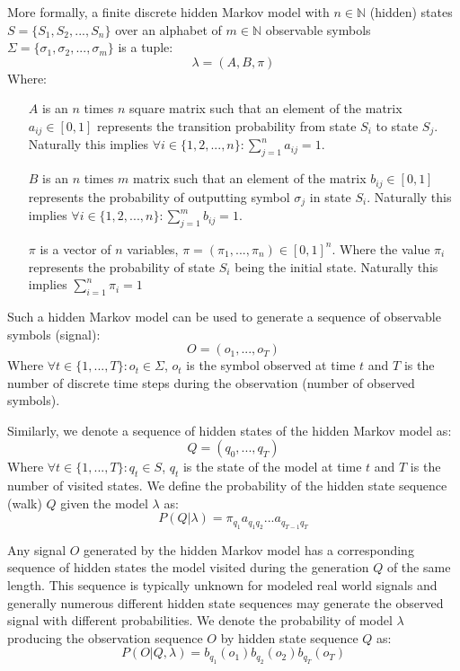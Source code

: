 More formally, a finite discrete hidden Markov model with $n \in \mathbb{N}$ (hidden) states $S = \{S_1, S_2, ..., S_n\}$ over an alphabet of $m \in \mathbb{N}$ observable symbols $\Sigma=\{\sigma_1, \sigma_2, ..., \sigma_m\}$ is a tuple: $$\lambda = (A, B, \pi)$$
Where:
\begin{itemize}
	\item[$A$] is an $n$ times $n$ square matrix such that an element of the matrix ${a_{ij} \in [0, 1]}$ represents the transition probability from state $S_i$ to state $S_j$. Naturally this implies ${\forall i \in \{1, 2, ..., n\}: \sum_{j=1}^n{a_{ij}} = 1}$.
	\item[$B$] is an $n$ times $m$ matrix such that an element of the matrix ${b_{ij} \in [0, 1]}$ represents the probability of outputting symbol $\sigma_j$ in state $S_i$. Naturally this implies ${\forall i \in \{1, 2, ..., n\}: \sum_{j=1}^m{b_{ij}} = 1}$.
	\item[$\pi$] is a vector of $n$ variables, ${\pi=(\pi_1, ..., \pi_n) \in [0, 1]^n}$. Where the value $\pi_i$ represents the probability of state $S_i$ being the initial state. Naturally this implies ${\sum_{i=1}^n{\pi_i} = 1}$
\end{itemize}

Such a hidden Markov model can be used to generate a sequence of observable symbols (signal): $$O = (o_1, ..., o_T)$$
Where ${\forall t \in \{1, ..., T\}: o_t \in \Sigma}$, $o_t$ is the symbol observed at time $t$ and $T$ is the number of discrete time steps during the observation (number of observed symbols).

Similarly, we denote a sequence of hidden states of the hidden Markov model as: $$Q = (q_0, ..., q_T)$$
Where ${\forall t \in \{1, ..., T\}: q_t \in S}$, $q_t$ is the state of the model at time $t$ and $T$ is the number of visited states.
We define the probability of the hidden state sequence (walk) $Q$ given the model $\lambda$ as:
$$P(Q|\lambda) = \pi_{q_1}a_{q_1q_2}...a_{q_{T-1}q_T}$$

Any signal $O$ generated by the hidden Markov model has a corresponding sequence of hidden states the model visited during the generation $Q$ of the same length. This sequence is typically unknown for modeled real world signals and generally numerous different hidden state sequences may generate the observed signal with different probabilities. We denote the probability of model $\lambda$ producing the observation sequence $O$ by hidden state sequence $Q$ as:
$$P(O|Q,\lambda) = b_{q_1}(o_1)b_{q_2}(o_2)b_{q_T}(o_T)$$


